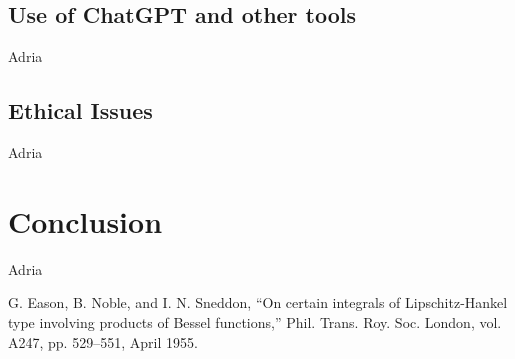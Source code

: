 \documentclass[conference]{IEEEtran}
\begin{document}
\subsection{Use of ChatGPT and other tools}
Adria
\subsection{Ethical Issues}
Adria



\section*{Conclusion}
Adria

\begin{thebibliography}{00}
 G. Eason, B. Noble, and I. N. Sneddon, ``On certain integrals of Lipschitz-Hankel type involving products of Bessel functions,'' Phil. Trans. Roy. Soc. London, vol. A247, pp. 529--551, April 1955.

\end{thebibliography}
\end{document}
